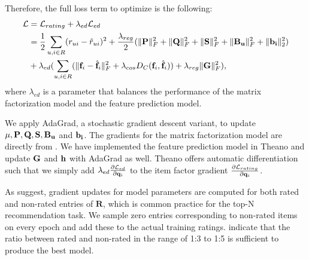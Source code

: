 Therefore, the full loss term to optimize is the following:
\begin{equation}
\begin{aligned}
	\mathcal{L} &= \mathcal{L}_{rating} + \lambda_{ed} \mathcal{L}_{ed} \\
				&= \frac{1}{2} \sum_{u,i \in R} (r_{ui} - \hat{r}_{ui})^2 + \frac{\lambda_{reg}}{2} (\lVert{\ensuremath{\mathbf{P}}}\rVert_F^2 + \lVert{\ensuremath{\mathbf{Q}}}\rVert_F^2 + \lVert{\ensuremath{\mathbf{S}}}\rVert_F^2 + \lVert{\ensuremath{\mathbf{B_u}}}\rVert_F^2 + \lVert{\ensuremath{\mathbf{b_i}}}\rVert_2^2) \\
				& + \lambda_{ed} (\sum_{u,i \in R} (\lVert{\ensuremath{\mathbf{f}}_i - \hat{\ensuremath{\mathbf{f}}}_i}\rVert_F^2 + \lambda_{cos} D_C(\mathbf{f}_i, \hat{\mathbf{f}}_i)) + \lambda_{reg} \lVert{\ensuremath{\mathbf{G}}}\rVert_F^2),
\end{aligned}
\end{equation}
where $\lambda_{ed}$ is a parameter that balances the performance of the matrix factorization model and the feature prediction model.

We apply AdaGrad, a stochastic gradient descent variant, to update $\mu, \mathbf{P}, \mathbf{Q}, \mathbf{S}, \mathbf{B_u}$ and $\mathbf{b_i}$.
The gradients for the matrix factorization model are directly from \cite{Kabbur2015}.
We have implemented the feature prediction model in Theano and update $\mathbf{G}$ and $\mathbf{h}$ with AdaGrad as well.
Theano offers automatic differentiation such that we simply add $\lambda_{ed} \frac{\partial \mathcal{L}_{ed}}{\partial \mathbf{q}_i}$ to the item factor gradient $\frac{\partial \mathcal{L}_{rating}}{\partial \mathbf{q}_i}$.

As \cite{Kabbur2015} suggest, gradient updates for model parameters are computed for both rated and non-rated entries of $\mathbf{R}$, which is common practice for the top-N recommendation task.
We sample zero entries corresponding to non-rated items on every epoch and add these to the actual training ratings.
\cite{Kabbur2015} indicate that the ratio between rated and non-rated in the range of 1:3 to 1:5 is sufficient to produce the best model.

